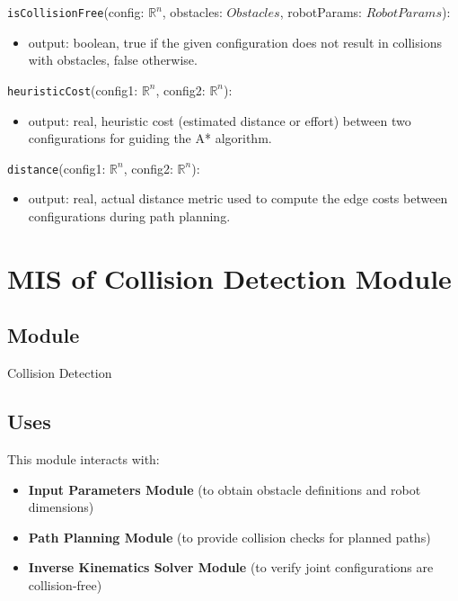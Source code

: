 \documentclass[12pt, titlepage]{article}
\begin{document}
  \noindent \texttt{isCollisionFree}(config: $\mathbb{R}^n$, obstacles: $Obstacles$, robotParams: $RobotParams$):
  \begin{itemize}
    \item output: boolean, true if the given configuration does not result in collisions with obstacles, false otherwise.
  \end{itemize}
  
  \noindent \texttt{heuristicCost}(config1: $\mathbb{R}^n$, config2: $\mathbb{R}^n$):
  \begin{itemize}
    \item output: real, heuristic cost (estimated distance or effort) between two configurations for guiding the A* algorithm.
  \end{itemize}
  
  \noindent \texttt{distance}(config1: $\mathbb{R}^n$, config2: $\mathbb{R}^n$):
  \begin{itemize}
    \item output: real, actual distance metric used to compute the edge costs between configurations during path planning.
  \end{itemize}
  

  \newpage
  \newpage  





\section{MIS of Collision Detection Module} \label{Module:CollisionDetection}

\subsection{Module}
Collision Detection

\subsection{Uses}
This module interacts with:
\begin{itemize}
\item \textbf{Input Parameters Module} (to obtain obstacle definitions and robot dimensions)
\item \textbf{Path Planning Module} (to provide collision checks for planned paths)
\item \textbf{Inverse Kinematics Solver Module} (to verify joint configurations are collision-free)
\end{itemize}
\end{document}
